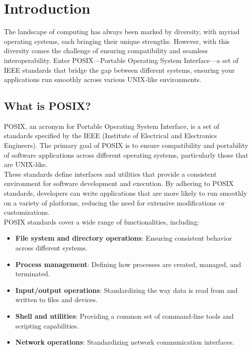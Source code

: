 \section{Introduction}

The landscape of computing has always been marked by diversity, with myriad operating systems, each bringing their unique strengths. However, with this diversity comes the challenge of ensuring compatibility and seamless interoperability. Enter POSIX—Portable Operating System Interface—a set of IEEE standards that bridge the gap between different systems, ensuring your applications run smoothly across various UNIX-like environments.
\\
\subsection{What is POSIX?}

POSIX, an acronym for Portable Operating System Interface, is a set of standards specified by the IEEE (Institute of Electrical and Electronics Engineers). The primary goal of POSIX is to ensure compatibility and portability of software applications across different operating systems, particularly those that are UNIX-like.
\\
These standards define interfaces and utilities that provide a consistent environment for software development and execution. By adhering to POSIX standards, developers can write applications that are more likely to run smoothly on a variety of platforms, reducing the need for extensive modifications or customizations.
\\
POSIX standards cover a wide range of functionalities, including: 
\begin{itemize} 
    \item \textbf{File system and directory operations}: Ensuring consistent behavior across different systems. 
    \item \textbf{Process management}: Defining how processes are created, managed, and terminated. 
    \item \textbf{Input/output operations}: Standardizing the way data is read from and written to files and devices. 
    \item \textbf{Shell and utilities}: Providing a common set of command-line tools and scripting capabilities. 
    \item \textbf{Network operations}: Standardizing network communication interfaces.
\end{itemize}

